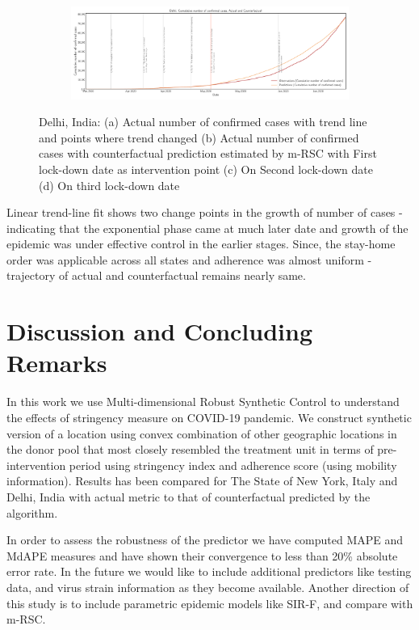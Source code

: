 \documentclass[preprint,authoryear,12pt]{elsarticle}
\begin{document}
\begin{figure}
		\begin{subfigure}[b]{\textwidth}
			\centering
			\includegraphics[width=0.8\linewidth,height=0.18\textheight]{Delhi_confirmed cases-L3-CUM}
		\end{subfigure}
		
		\caption[Delhi]{Delhi, India: (a) Actual number of confirmed cases with  trend line and points where trend changed (b) Actual number of confirmed cases with counterfactual prediction estimated by m-RSC with First lock-down date as intervention point (c) On Second lock-down date (d) On third  lock-down date}
		\label{fig7} 
	\end{figure}
	
	Linear trend-line fit shows two change points in the growth of number of cases - indicating that the exponential phase came at much later date and growth of the epidemic was under effective control in the earlier stages. Since, the stay-home order was applicable across all states and adherence was almost uniform -  trajectory of actual and counterfactual remains nearly same.
	
	\section{Discussion and Concluding Remarks}
	\label{SEC5}
	In this work we use Multi-dimensional Robust Synthetic Control to understand the effects of stringency measure on COVID-19 pandemic. We construct synthetic version of a location using convex combination of other geographic locations in the donor pool that most closely resembled the treatment unit in terms of pre-intervention period using stringency index and adherence score (using mobility information). Results has been compared for The State of New York, Italy and Delhi, India with actual metric to that of counterfactual predicted by the algorithm.
	
	In order to assess the robustness of the predictor we have computed MAPE and MdAPE measures and have shown their convergence to less than 20\% absolute error rate. In the future we would like to include  additional predictors like testing data, and virus strain information as they become available. Another direction of this study is to include parametric epidemic models like SIR-F\cite{Siettos2013}, and compare with m-RSC.
	
\end{document}
